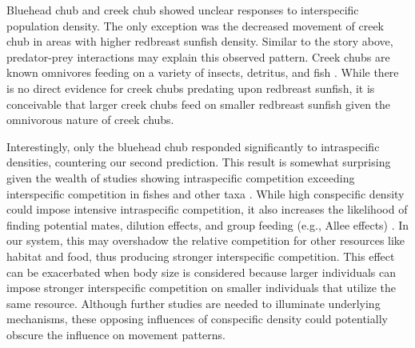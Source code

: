 \documentclass[11pt, class=article, crop=false]{standalone}
\begin{document}
Bluehead chub and creek chub showed unclear responses to interspecific population density. The only exception was the decreased movement of creek chub in areas with higher redbreast sunfish density. Similar to the story above, predator-prey interactions may explain this observed pattern. Creek chubs are known omnivores feeding on a variety of insects, detritus, and fish \citep{champagneRiparianBuffersMaintain2022, leonardApplicationTestingIndex1986, quistSummerFoodHabits2006}. While there is no direct evidence for creek chubs predating upon redbreast sunfish, it is conceivable that larger creek chubs feed on smaller redbreast sunfish given the omnivorous nature of creek chubs.

Interestingly, only the bluehead chub responded significantly to intraspecific densities, countering our second prediction. This result is somewhat surprising given the wealth of studies showing intraspecific competition exceeding interspecific competition in fishes \citep{websterMechanismsIndividualConsequences2000, wardIntraspecificFoodCompetition2006} and other taxa \citep{adlerCompetitionCoexistencePlant2018, barabasEffectIntraInterspecific2016, thompsonProcessbasedMetacommunityFramework2020, chessonRolesHarshFluctuating1997, tilmanResourceCompetitionCommunity1982, mcpeekIntraspecificDensityDependence2012}. While high conspecific density could impose intensive intraspecific competition, it also increases the likelihood of finding potential mates, dilution effects, and group feeding (e.g., Allee effects) \citep{courchampAlleeEffectsEcology2008, gascoigneAlleeEffectsDriven2004, teruiCrypticAlleeEffect2015}. In our system, this may overshadow the relative competition for other resources like habitat and food, thus producing stronger interspecific competition. This effect can be exacerbated when body size is considered because larger individuals can impose stronger interspecific competition on smaller individuals that utilize the same resource. Although further studies are needed to illuminate underlying mechanisms, these opposing influences of conspecific density could potentially obscure the influence on movement patterns. 
\end{document}
